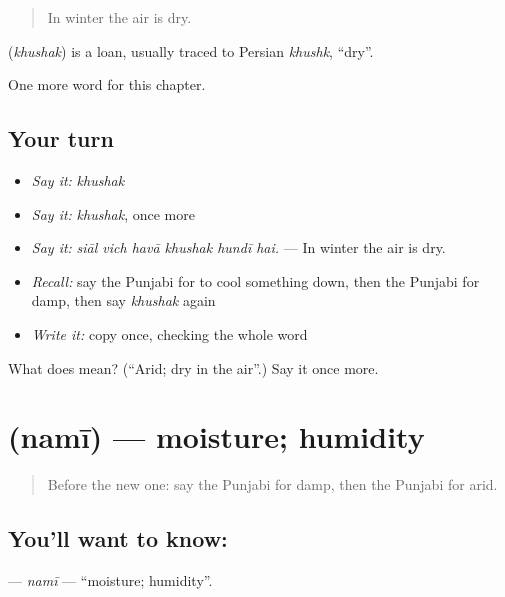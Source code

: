 \begin{quote}
In winter the air is dry.
\end{quote}

\begin{cousinweb}
\textbf{} (\emph{khushak}) is a loan, usually traced to Persian \emph{khushk}, \textquotedblleft{}dry\textquotedblright{}.
\end{cousinweb}

\begin{grammarlens}[title={What you've built}]
One more word for this chapter.
\end{grammarlens}

\subsection*{Your turn}
\begin{itemize}
\raggedright
  \item \emph{Say it:} \emph{khushak}
  \item \emph{Say it:} \emph{khushak}, once more
  \item \emph{Say it:} \emph{siāl vich havā khushak hundī hai.} — In winter the air is dry.
  \item \emph{Recall:} say the Punjabi for to cool something down, then the Punjabi for damp, then say \emph{khushak} again
  \item \emph{Write it:} copy \textbf{} once, checking the whole word
\end{itemize}

\begin{tcolorbox}[breakable,colback=teal!4,colframe=teal!35!black,title={Before you move on}]
What does  mean? (\textquotedblleft{}Arid; dry in the air\textquotedblright{}.) Say it once more.
\end{tcolorbox}
\section[\texorpdfstring{\pa{ਨਮੀ} (namī)}{ਨਮੀ (namī)}]{ (namī) — moisture; humidity}

\label{lesson:PA-C292-nami}



\begin{quote}
Before the new one: say the Punjabi for damp, then the Punjabi for arid.
\end{quote}

\subsection*{You'll want to know: }
\textbf{} — \emph{namī} — \textquotedblleft{}moisture; humidity\textquotedblright{}.

